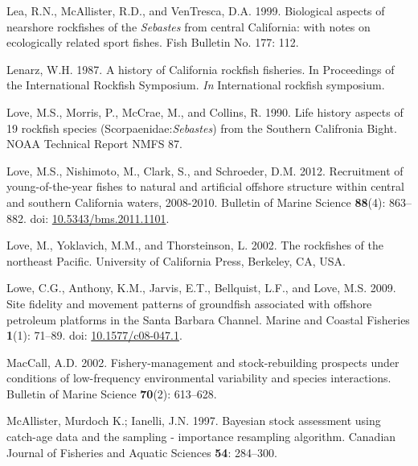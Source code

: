 \documentclass[
  english,
  a4paper,
]{article}
\newlength{\cslhangindent}
\newlength{\cslentryspacingunit} %
\newenvironment{CSLReferences}[2] %
 {%
  \setlength{\parindent}{0pt}
  \ifodd #1
  \let\oldpar\par
  \def\par{\hangindent=\cslhangindent\oldpar}
  \fi
  \setlength{\parskip}{#2\cslentryspacingunit}
 }%
 {}
\begin{document}
\begin{CSLReferences}{1}{0}
\leavevmode{}%
Lea, R.N., McAllister, R.D., and VenTresca, D.A. 1999. {Biological aspects of nearshore rockfishes of the \emph{Sebastes} from central California: with notes on ecologically related sport fishes.} Fish Bulletin No. 177: 112.

\leavevmode{}%
Lenarz, W.H. 1987. {A history of California rockfish fisheries. In Proceedings of the International Rockfish Symposium.} \emph{In} International rockfish symposium.

\leavevmode{}%
Love, M.S., Morris, P., McCrae, M., and Collins, R. 1990. {Life history aspects of 19 rockfish species (Scorpaenidae:\emph{Sebastes}) from the Southern Califronia Bight}. NOAA Technical Report NMFS 87.

\leavevmode{}%
Love, M.S., Nishimoto, M., Clark, S., and Schroeder, D.M. 2012. {Recruitment of young-of-the-year fishes to natural and artificial offshore structure within central and southern California waters, 2008-2010}. Bulletin of Marine Science \textbf{88}(4): 863--882. doi: \href{https://doi.org/10.5343/bms.2011.1101}{10.5343/bms.2011.1101}.

\leavevmode{}%
Love, M., Yoklavich, M.M., and Thorsteinson, L. 2002. {The rockfishes of the northeast Pacific}. University of California Press, Berkeley, CA, USA.

\leavevmode{}%
Lowe, C.G., Anthony, K.M., Jarvis, E.T., Bellquist, L.F., and Love, M.S. 2009. {Site fidelity and movement patterns of groundfish associated with offshore petroleum platforms in the Santa Barbara Channel}. Marine and Coastal Fisheries \textbf{1}(1): 71--89. doi: \href{https://doi.org/10.1577/c08-047.1}{10.1577/c08-047.1}.

\leavevmode{}%
MacCall, A.D. 2002. {Fishery-management and stock-rebuilding prospects under conditions of low-frequency environmental variability and species interactions}. Bulletin of Marine Science \textbf{70}(2): 613--628.

\leavevmode{}%
McAllister, Murdoch K.; Ianelli, J.N. 1997. {Bayesian stock assessment using catch-age data and the sampling - importance resampling algorithm}. Canadian Journal of Fisheries and Aquatic Sciences \textbf{54}: 284--300.


\end{CSLReferences}
\end{document}

